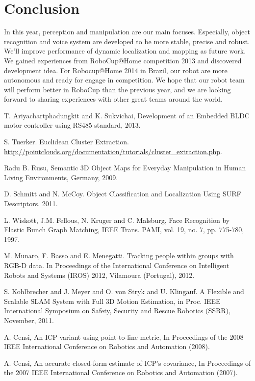 \documentclass{llncs}
\begin{document}
\section{Conclusion}

In this year, perception and manipulation are our main focuses. Especially, object recognition and voice system are developed to be more stable, precise and robust. We'll improve performance of dynamic localization and mapping as future work. We gained experiences from RoboCup@Home competition 2013 and discovered development idea. For Robocup@Home 2014 in Brazil, our robot are more autonomous and ready for engage in competition. We hope that our robot team will perform better in RoboCup than the previous year, and we are looking forward to sharing experiences with other great teams around the world.

\begin{thebibliography}{4}

 T. Ariyachartphadungkit and K. Sukvichai, Development of an Embedded BLDC motor controller using RS485 standard, 2013.

 S. Tuerker. Euclidean Cluster Extraction.\\
\url{http://pointclouds.org/documentation/tutorials/cluster_extraction.php}.

 Radu B. Rusu, 
Semantic 3D Object Maps for Everyday Manipulation in Human Living Environments, Germany, 2009.

 D. Schmitt and N. McCoy. Object Classification and Localization Using SURF Descriptors. 2011.

 L. Wiskott, J.M. Fellous, N. Kruger and C. Malsburg, Face Recognition by Elastic Bunch Graph Matching, IEEE Trans. PAMI, vol. 19, no. 7, pp. 775-780, 1997. 

 M. Munaro, F. Basso and E. Menegatti. Tracking people within groups with RGB-D data. In Proceedings of the International Conference on Intelligent Robots and Systems (IROS) 2012, Vilamoura (Portugal), 2012.

 S. Kohlbrecher and J. Meyer and O. von Stryk and U. Klingauf. A Flexible and Scalable SLAM System with Full 3D Motion Estimation, in Proc. IEEE International Symposium on Safety, Security and Rescue Robotics (SSRR), November, 2011.

 A. Censi, An ICP variant using point-to-line metric, In Proceedings of the 2008 IEEE International Conference on Robotics and Automation (2008).

 A. Censi, An accurate closed-form estimate of ICP's covariance, In Proceedings of the 2007 IEEE International Conference on Robotics and Automation (2007).

\end{thebibliography}
\end{document}
